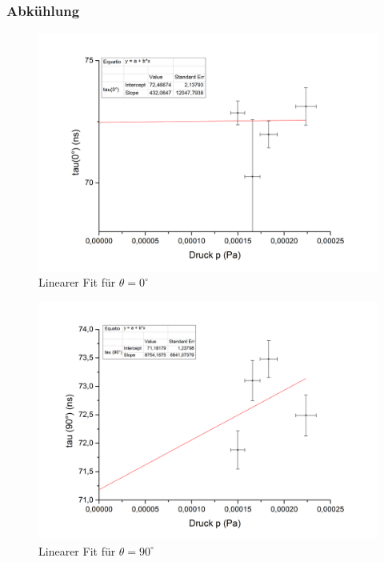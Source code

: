 \subsubsection{Abkühlung}
\begin{figure}[h]
\begin{center}
\includegraphics[scale=0.5]{Bilder/abkuehlung_0}
\caption{Linearer Fit für $\theta=0^{\circ}$}
\end{center}
\end{figure}
\begin{figure}[h]
\begin{center}
\includegraphics[scale=0.5]{Bilder/abkuehlung_90}
\caption{Linearer Fit für $\theta=90^{\circ}$}
\end{center}
\end{figure}
~\\
